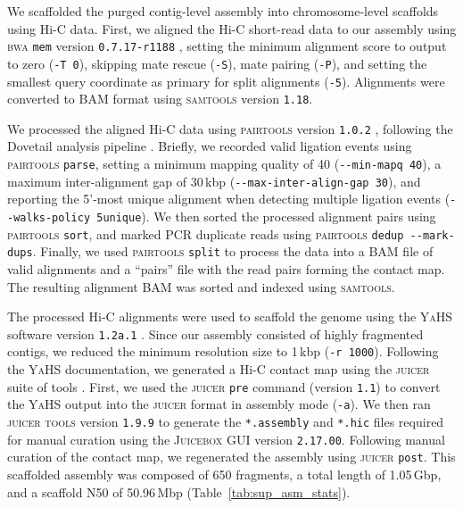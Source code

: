 We scaffolded the purged contig-level assembly into chromosome-level scaffolds using
Hi-C data. First, we aligned the Hi-C short-read data to our assembly using
\textsc{bwa} \texttt{mem} version \texttt{0.7.17-r1188} \citep{li_aligning_2013},
setting the minimum alignment score to output to zero (\texttt{-T 0}), skipping mate
rescue (\texttt{-S}), mate pairing (\texttt{-P}), and setting the smallest query
coordinate as primary for split alignments (\texttt{-5}). Alignments were converted
to BAM format using \textsc{samtools} version \texttt{1.18}.
\vspace{0.1cm}

We processed the aligned Hi-C data using \textsc{pairtools} version \texttt{1.0.2}
\citep{open2c_pairtools_2023}, following the Dovetail analysis pipeline
\citep{dovetail}. Briefly, we recorded valid ligation
events using \textsc{pairtools} \texttt{parse}, setting a minimum mapping quality of
40 (\texttt{-{}-min-mapq 40}), a maximum inter-alignment gap of 30\,kbp
(\texttt{-{}-max-inter-align-gap 30}), and reporting the 5'-most unique alignment when
detecting multiple ligation events (\texttt{-{}-walks-policy 5unique}). We then sorted
the processed alignment pairs using \textsc{pairtools} \texttt{sort}, and marked PCR
duplicate reads using \textsc{pairtools} \texttt{dedup -{}-mark-dups}. Finally, we used
\textsc{pairtools} \texttt{split} to process the data into a BAM file of valid
alignments and a ``pairs'' file with the read pairs forming the contact map. The
resulting alignment BAM was sorted and indexed using \textsc{samtools}.
\vspace{0.1cm}

The processed Hi-C alignments were used to scaffold the genome using the \textsc{YaHS}
software version \texttt{1.2a.1} \citep{zhou_yahs_2023}. Since our assembly consisted of
highly fragmented contigs, we reduced the minimum resolution size to 1\,kbp (\texttt{-r
1000}). Following the \textsc{YaHS} documentation, we generated a Hi-C contact map
using the \textsc{juicer} suite of tools \citep{durand_juicer_2016,dudchenko_juicebox_2018}.
First, we used the \textsc{juicer} \texttt{pre} command (version \texttt{1.1}) to
convert the \textsc{YaHS} output into the \textsc{juicer} format in assembly mode
(\texttt{-a}). We then ran \textsc{juicer tools} version \texttt{1.9.9} to generate
the \texttt{*.assembly} and \texttt{*.hic} files required for manual curation using
the \textsc{Juicebox} GUI version \texttt{2.17.00}. Following manual curation of
the contact map, we regenerated the assembly using \textsc{juicer} \texttt{post}. This
scaffolded assembly was composed of 650 fragments, a total length of 1.05\,Gbp, and
a scaffold N50 of 50.96\,Mbp (Table~\ref{tab:sup_asm_stats}).

